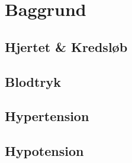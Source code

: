 \chapter{Baggrund}
\section{Hjertet \& Kredsløb}
\section{Blodtryk}
\section{Hypertension}
\section{Hypotension}

